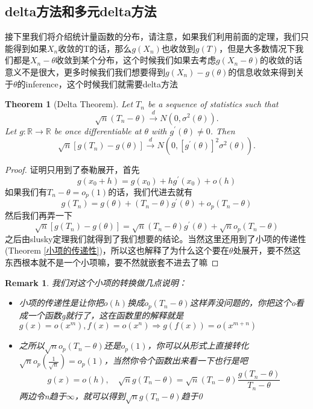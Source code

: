 \documentclass{article}
\newtheorem{theorem}{Theorem}[section]
\newtheorem*{proof}{Proof}
\newtheorem{remark}{Remark}[theorem]
\begin{document}
\subsection{delta方法和多元delta方法}
\par 接下里我们将介绍统计量函数的分布，请注意，如果我们利用前面的定理，我们只能得到如果$X_n$收敛的T的话，那么$g(X_n)$也收敛到$g(T)$，但是大多数情况下我们都是$X_n-\theta$收敛到某个分布，这个时候我们如果去考虑$g(X_n-\theta)$的收敛的话意义不是很大，更多时候我们我们想要得到$g(X_n)-g(\theta)$的信息收敛来得到关于$\theta$的inference，这个时候我们就需要delta方法
\begin{theorem}[Delta Theorem]
	Let $T_n$ be a sequence of statistics such that
	$$
	\sqrt{n}\left(T_n-\theta\right) \stackrel{d}{\rightarrow} N\left(0, \sigma^2(\theta)\right) .
	$$
	Let $g: \mathbb{R} \rightarrow \mathbb{R}$ be once differentiable at $\theta$ with $g^{\prime}(\theta) \neq 0$. Then
	$$
	\sqrt{n}\left[g\left(T_n\right)-g(\theta)\right] \stackrel{d}{\rightarrow} N\left(0,\left[g^{\prime}(\theta)\right]^2 \sigma^2(\theta)\right) .
	$$
\end{theorem}
\begin{proof}
	证明只用到了泰勒展开，首先
	$$
	g\left(x_0+h\right)=g\left(x_0\right)+h g^{\prime}\left(x_0\right)+o(h)
	$$
	如果我们有$T_n-\theta=o_p(1)$的话，我们代进去就有
	$$
	g\left(T_n\right)=g(\theta)+\left(T_n-\theta\right) g^{\prime}(\theta)+o_p\left(T_n-\theta\right)
	$$
	然后我们再弄一下
	$$
	\sqrt{n}\left[g\left(T_n\right)-g(\theta)\right]=\sqrt{n}\left(T_n-\theta\right) g^{\prime}(\theta)+\sqrt{n} o_p\left(T_n-\theta\right)
	$$
	之后由slusky定理我们就得到了我们想要的结论。当然这里还用到了小项的传递性(Theorem \ref{小项的传递性})，所以这也解释了为什么这个要在$\theta$处展开，要不然这东西根本就不是一个小项嘛，要不然就嵌套不进去了嘛
\end{proof}
\begin{remark}
	我们对这个小项的转换做几点说明：
	\begin{itemize}
		\item 小项的传递性是让你把$o(h)$换成$o_p(T_n-\theta)$这样弄没问题的，你把这个o看成一个函数g就行了，这在函数里的解释就是$g(x)=o(x^m),f(x)=o(x^n)\Rightarrow g(f(x))=o(x^{m+n})$
		\item 之所以$\sqrt{n} o_p\left(T_n-\theta\right)$还是$o_p(1)$，你可以从形式上直接转化$\sqrt{n} o_p\left(\frac{1}{\sqrt{n}}\right)=o_p(1)$，当然你令个函数出来看一下也行是吧
		$$
		g(x)=o(h),\quad \sqrt{n}g(T_n-\theta)=\sqrt{n}(T_n-\theta)\frac{g(T_n-\theta)}{T_n-\theta}
		$$
		两边令n趋于$\infty$，就可以得到$\sqrt{n}g(T_n-\theta)$趋于0
	\end{itemize}
\end{remark}
\end{document}
